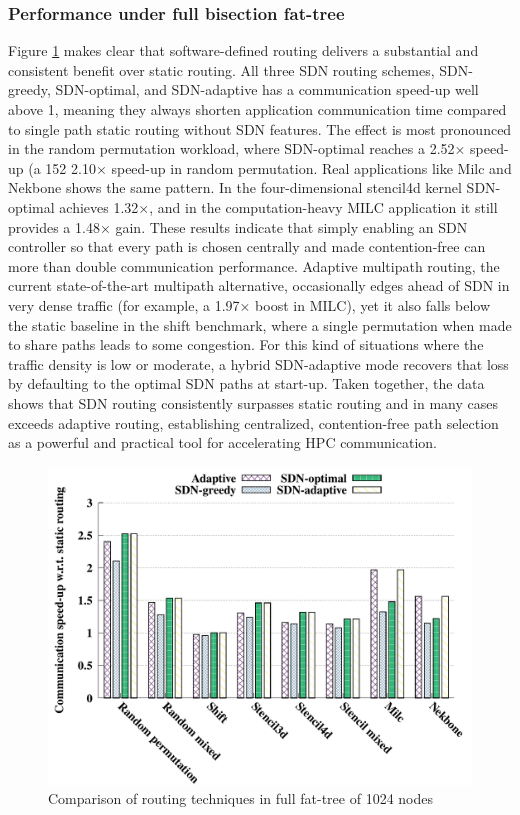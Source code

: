 \subsubsection{Performance under full bisection fat-tree}
Figure \ref{fig:routing_full} makes clear that software-defined routing delivers
a substantial and consistent benefit over static routing. All three SDN routing
schemes, SDN-greedy, SDN-optimal, and SDN-adaptive has a communication speed-up well above 1, meaning they
always shorten application communication time compared to single path static routing without SDN features. The effect is most pronounced in the
random permutation workload, where SDN-optimal reaches a 2.52×
speed-up (a 152 %
2.10× speed-up in random permutation. Real applications like Milc and Nekbone shows the same pattern. In the four-dimensional stencil4d
kernel SDN-optimal achieves 1.32×, and in the computation-heavy MILC
application it still provides a 1.48× gain. These results indicate that simply
enabling an SDN controller so that every path is chosen centrally and made
contention-free can more than double communication
performance.
Adaptive multipath routing, the current state-of-the-art multipath alternative,
occasionally edges ahead of SDN in very dense traffic (for example, a 1.97×
boost in MILC), yet it also falls below the static baseline in the shift
benchmark, where a single permutation when made to share paths leads to some congestion. For this kind of situations where the traffic density is low or moderate, a hybrid SDN-adaptive mode recovers that loss by defaulting to the
optimal SDN paths at start-up. Taken together, the data shows that SDN routing
consistently surpasses static routing and in many cases exceeds
adaptive routing, establishing centralized, contention-free path selection as a powerful
and practical tool for accelerating HPC communication.

\begin{figure}[h]
  \centering
  \includegraphics[width=\columnwidth]{./figs_4/routing_full.pdf}
  \caption{Comparison of routing techniques in full fat-tree of 1024 nodes}
  \label{fig:routing_full}
\end{figure}

